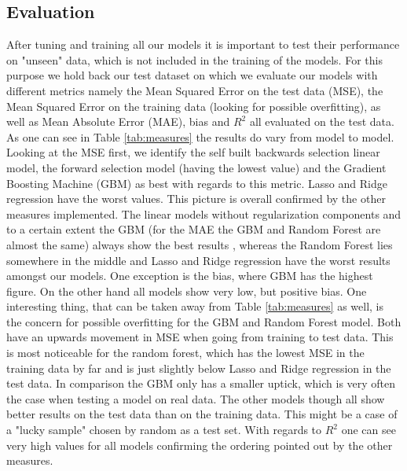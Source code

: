 \subsection{Evaluation}
After tuning and training all our models it is important to test their performance on "unseen" data, which is not included in the training of the models. For this purpose we hold back our test dataset on which we evaluate our models with different metrics namely the Mean Squared Error on the test data (MSE), the Mean Squared Error on the training data (looking for possible overfitting),  as well as  Mean Absolute Error (MAE), bias and  $R^2$ all evaluated on the test data. As one can see in Table \ref{tab:measures} the results do vary from model to model. Looking at the MSE first, we identify the self built backwards selection linear model, the forward selection model (having the lowest value) and the Gradient Boosting Machine (GBM) as best with regards to this metric. Lasso and Ridge regression have the worst values. This picture is overall confirmed by the other measures implemented. The linear models without regularization components and to a certain extent the GBM (for the MAE the GBM and Random Forest are almost the same) always show the best results , whereas the Random Forest lies somewhere in the middle and Lasso and Ridge regression have the worst results amongst our models. One exception is the bias, where GBM has the highest figure. On the other hand all models show very low, but positive bias. One interesting thing, that can be taken away from Table \ref{tab:measures} as well, is the concern for possible overfitting for the GBM and Random Forest model.
Both have an upwards movement in MSE when going from training to test data. This is most noticeable for the random forest, which has the lowest MSE in the training data by far and is just slightly below Lasso and Ridge regression in the test data. In comparison the GBM only has a smaller uptick, which is very often the case when testing a model on real data. The other models though all show better results on the test data than on the training data. This might be a case of a "lucky sample" chosen by random as a test set. With regards to $R^2$ one can see very high values for all models confirming the ordering pointed out by the other measures.





